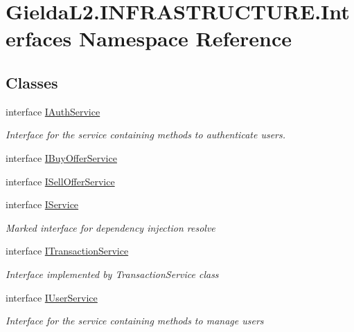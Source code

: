\hypertarget{namespace_gielda_l2_1_1_i_n_f_r_a_s_t_r_u_c_t_u_r_e_1_1_interfaces}{}\section{Gielda\+L2.\+I\+N\+F\+R\+A\+S\+T\+R\+U\+C\+T\+U\+R\+E.\+Interfaces Namespace Reference}
\label{namespace_gielda_l2_1_1_i_n_f_r_a_s_t_r_u_c_t_u_r_e_1_1_interfaces}
\subsection*{Classes}
\begin{DoxyCompactItemize}
\item 
interface \mbox{\hyperlink{interface_gielda_l2_1_1_i_n_f_r_a_s_t_r_u_c_t_u_r_e_1_1_interfaces_1_1_i_auth_service}{I\+Auth\+Service}}
\begin{DoxyCompactList}\small\item\em Interface for the service containing methods to authenticate users. \end{DoxyCompactList}\item 
interface \mbox{\hyperlink{interface_gielda_l2_1_1_i_n_f_r_a_s_t_r_u_c_t_u_r_e_1_1_interfaces_1_1_i_buy_offer_service}{I\+Buy\+Offer\+Service}}
\item 
interface \mbox{\hyperlink{interface_gielda_l2_1_1_i_n_f_r_a_s_t_r_u_c_t_u_r_e_1_1_interfaces_1_1_i_sell_offer_service}{I\+Sell\+Offer\+Service}}
\item 
interface \mbox{\hyperlink{interface_gielda_l2_1_1_i_n_f_r_a_s_t_r_u_c_t_u_r_e_1_1_interfaces_1_1_i_service}{I\+Service}}
\begin{DoxyCompactList}\small\item\em Marked interface for dependency injection resolve \end{DoxyCompactList}\item 
interface \mbox{\hyperlink{interface_gielda_l2_1_1_i_n_f_r_a_s_t_r_u_c_t_u_r_e_1_1_interfaces_1_1_i_transaction_service}{I\+Transaction\+Service}}
\begin{DoxyCompactList}\small\item\em Interface implemented by Transaction\+Service class \end{DoxyCompactList}\item 
interface \mbox{\hyperlink{interface_gielda_l2_1_1_i_n_f_r_a_s_t_r_u_c_t_u_r_e_1_1_interfaces_1_1_i_user_service}{I\+User\+Service}}
\begin{DoxyCompactList}\small\item\em Interface for the service containing methods to manage users \end{DoxyCompactList}\end{DoxyCompactItemize}
